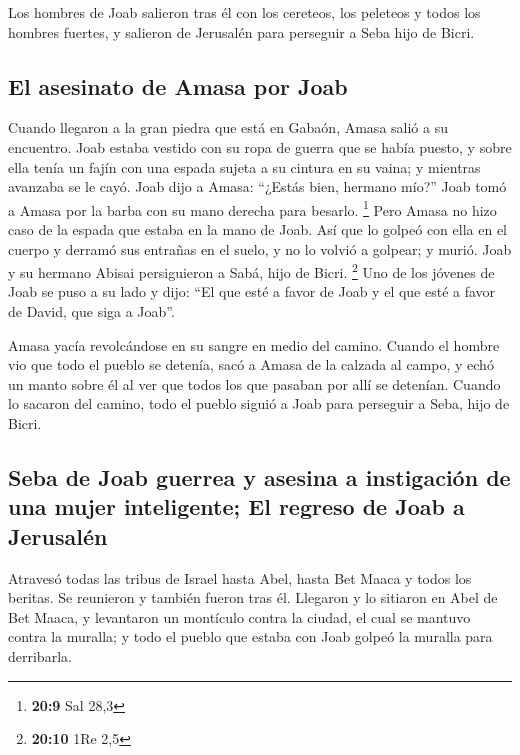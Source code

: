 \begin{paracol}{2}
 Los hombres de Joab salieron tras él con los cereteos,
los peleteos y todos los hombres fuertes, y salieron de Jerusalén para
perseguir a Seba hijo de Bicri.

\hypertarget{el-asesinato-de-amasa-por-joab}{%
\subsection{El asesinato de Amasa por
Joab}\label{el-asesinato-de-amasa-por-joab}}

 Cuando llegaron a la gran piedra que está en Gabaón,
Amasa salió a su encuentro. Joab estaba vestido con su ropa de guerra
que se había puesto, y sobre ella tenía un fajín con una espada sujeta a
su cintura en su vaina; y mientras avanzaba se le cayó. 
Joab dijo a Amasa: ``¿Estás bien, hermano mío?'' Joab tomó a Amasa por
la barba con su mano derecha para besarlo. \footnote{\textbf{20:9} Sal
  28,3}  Pero Amasa no hizo caso de la espada que estaba
en la mano de Joab. Así que lo golpeó con ella en el cuerpo y derramó
sus entrañas en el suelo, y no lo volvió a golpear; y murió. Joab y su
hermano Abisai persiguieron a Sabá, hijo de Bicri. \footnote{\textbf{20:10}
  1Re 2,5}  Uno de los jóvenes de Joab se puso a su lado
y dijo: ``El que esté a favor de Joab y el que esté a favor de David,
que siga a Joab''.

 Amasa yacía revolcándose en su sangre en medio del
camino. Cuando el hombre vio que todo el pueblo se detenía, sacó a Amasa
de la calzada al campo, y echó un manto sobre él al ver que todos los
que pasaban por allí se detenían.  Cuando lo sacaron del
camino, todo el pueblo siguió a Joab para perseguir a Seba, hijo de
Bicri.

\hypertarget{seba-de-joab-guerrea-y-asesina-a-instigaciuxf3n-de-una-mujer-inteligente-el-regreso-de-joab-a-jerusaluxe9n}{%
\subsection{Seba de Joab guerrea y asesina a instigación de una mujer
inteligente; El regreso de Joab a
Jerusalén}\label{seba-de-joab-guerrea-y-asesina-a-instigaciuxf3n-de-una-mujer-inteligente-el-regreso-de-joab-a-jerusaluxe9n}}

 Atravesó todas las tribus de Israel hasta Abel, hasta
Bet Maaca y todos los beritas. Se reunieron y también fueron tras él.
 Llegaron y lo sitiaron en Abel de Bet Maaca, y
levantaron un montículo contra la ciudad, el cual se mantuvo contra la
muralla; y todo el pueblo que estaba con Joab golpeó la muralla para
derribarla.


\end{paracol}
